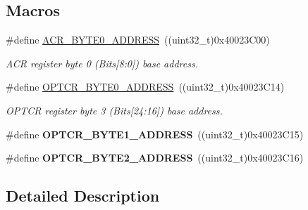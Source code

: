 \subsection*{Macros}
\begin{DoxyCompactItemize}
\item 
\hypertarget{group___f_l_a_s_h___exported___constants_gaeaca61fbcff69df08100280868bff214}{\#define \hyperlink{group___f_l_a_s_h___exported___constants_gaeaca61fbcff69df08100280868bff214}{A\-C\-R\-\_\-\-B\-Y\-T\-E0\-\_\-\-A\-D\-D\-R\-E\-S\-S}~((uint32\-\_\-t)0x40023\-C00)}\label{group___f_l_a_s_h___exported___constants_gaeaca61fbcff69df08100280868bff214}

\begin{DoxyCompactList}\small\item\em A\-C\-R register byte 0 (Bits\mbox{[}8\-:0\mbox{]}) base address. \end{DoxyCompactList}\item 
\hypertarget{group___f_l_a_s_h___exported___constants_ga8223df020203a97af44e4b14e219d01e}{\#define \hyperlink{group___f_l_a_s_h___exported___constants_ga8223df020203a97af44e4b14e219d01e}{O\-P\-T\-C\-R\-\_\-\-B\-Y\-T\-E0\-\_\-\-A\-D\-D\-R\-E\-S\-S}~((uint32\-\_\-t)0x40023\-C14)}\label{group___f_l_a_s_h___exported___constants_ga8223df020203a97af44e4b14e219d01e}

\begin{DoxyCompactList}\small\item\em O\-P\-T\-C\-R register byte 3 (Bits\mbox{[}24\-:16\mbox{]}) base address. \end{DoxyCompactList}\item 
\hypertarget{group___f_l_a_s_h___exported___constants_ga3c08568a9b3a9d213a70eff8e87117ac}{\#define {\bfseries O\-P\-T\-C\-R\-\_\-\-B\-Y\-T\-E1\-\_\-\-A\-D\-D\-R\-E\-S\-S}~((uint32\-\_\-t)0x40023\-C15)}\label{group___f_l_a_s_h___exported___constants_ga3c08568a9b3a9d213a70eff8e87117ac}

\item 
\hypertarget{group___f_l_a_s_h___exported___constants_ga600e8029b876676da246a62924a294c7}{\#define {\bfseries O\-P\-T\-C\-R\-\_\-\-B\-Y\-T\-E2\-\_\-\-A\-D\-D\-R\-E\-S\-S}~((uint32\-\_\-t)0x40023\-C16)}\label{group___f_l_a_s_h___exported___constants_ga600e8029b876676da246a62924a294c7}

\end{DoxyCompactItemize}


\subsection{Detailed Description}
